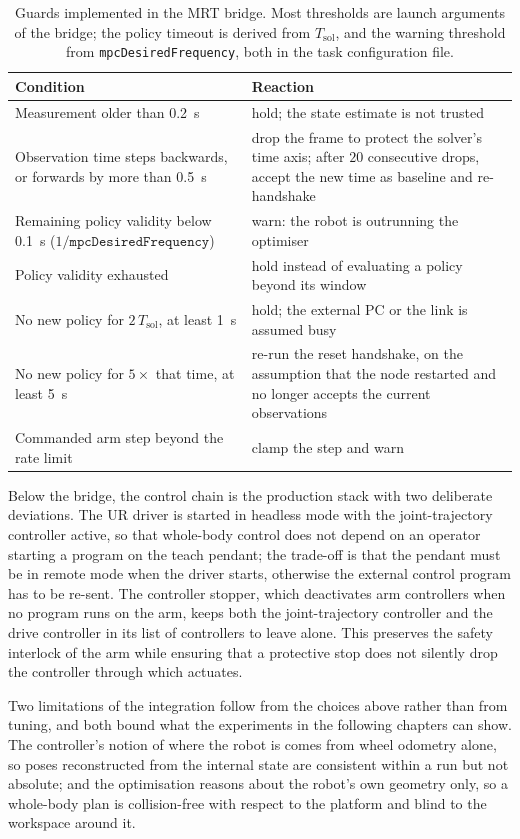 \begin{table}[htbp]
  \centering
  \caption[Guards implemented in the MRT bridge]{%
    Guards implemented in the MRT bridge. Most thresholds are launch
    arguments of the bridge; the policy timeout is derived from
    $T_\mathrm{sol}$, and the warning threshold from
    \texttt{mpcDesiredFrequency}, both in the task configuration file.}
  \label{tab:bridge-guards}
  \begin{tabularx}{\linewidth}{@{}lX@{}}
    \toprule
    Condition & Reaction \\
    \midrule
    Measurement older than \qty{0.2}{\second}
      & hold; the state estimate is not trusted \\
    Observation time steps backwards, or forwards by more than
    \qty{0.5}{\second}
      & drop the frame to protect the solver's time axis; after $20$
        consecutive drops, accept the new time as baseline and
        re-handshake \\
    Remaining policy validity below \qty{0.1}{\second}
      ($1/\texttt{mpcDesiredFrequency}$)
      & warn: the robot is outrunning the optimiser \\
    Policy validity exhausted
      & hold instead of evaluating a policy beyond its window \\
    No new policy for $2\,T_\mathrm{sol}$, at least \qty{1}{\second}
      & hold; the external PC or the link is assumed busy \\
    No new policy for $5\times$ that time, at least \qty{5}{\second}
      & re-run the reset handshake, on the assumption that the \mpc{}
        node restarted and no longer accepts the current observations \\
    Commanded arm step beyond the rate limit
      & clamp the step and warn \\
    \bottomrule
  \end{tabularx}
\end{table}

Below the bridge, the control chain is the production \hero{} stack with
two deliberate deviations. The UR driver is started in headless mode
with the joint-trajectory controller active, so that whole-body control
does not depend on an operator starting a program on the teach pendant;
the trade-off is that the pendant must be in remote mode when the driver
starts, otherwise the external control program has to be re-sent. The
controller stopper, which deactivates arm controllers when no
program runs on the arm, keeps both the joint-trajectory controller and
the drive controller in its list of controllers to leave alone. This
preserves the safety interlock of the arm while ensuring that a
protective stop does not silently drop the controller through which
\ocs{} actuates.

Two limitations of the integration follow from the choices above rather
than from tuning, and both bound what the experiments in the following
chapters can show. The controller's notion of where the robot is comes
from wheel odometry alone, so \ee{} poses reconstructed from the
internal state are consistent within a run but not absolute; and the
optimisation reasons about the robot's own geometry only, so a
whole-body plan is collision-free with respect to the platform and blind
to the workspace around it.
